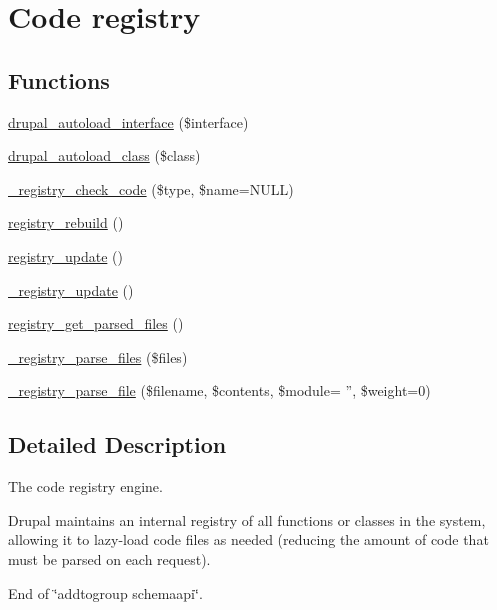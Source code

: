 \hypertarget{group__registry}{
\section{Code registry}
\label{group__registry}
}
\subsection*{Functions}
\begin{DoxyCompactItemize}
\item 
\hyperlink{group__registry_gaf7822bbec92566b95a44dc1c224389e8}{drupal\_\-autoload\_\-interface} (\$interface)
\item 
\hyperlink{group__registry_ga0fee2e4ebba5986067aa486c3436f51e}{drupal\_\-autoload\_\-class} (\$class)
\item 
\hyperlink{group__registry_gac399c501a8a90c383ea9a901a3a45ed6}{\_\-registry\_\-check\_\-code} (\$type, \$name=NULL)
\item 
\hyperlink{group__registry_ga63939dbdcf7950c97292f7d341f6d339}{registry\_\-rebuild} ()
\item 
\hyperlink{group__registry_gaab1bcea9fb061684c700676aa5ebe608}{registry\_\-update} ()
\item 
\hyperlink{group__registry_ga5008c77b133d55af7f1f4442d9e51167}{\_\-registry\_\-update} ()
\item 
\hyperlink{group__registry_ga072b32f340e117845791d7c6770da0f1}{registry\_\-get\_\-parsed\_\-files} ()
\item 
\hyperlink{group__registry_ga3b95761af0c42b685a2f1c4bc39b12d4}{\_\-registry\_\-parse\_\-files} (\$files)
\item 
\hyperlink{group__registry_ga9836752d4694599ffe4c393ff037fd44}{\_\-registry\_\-parse\_\-file} (\$filename, \$contents, \$module= '', \$weight=0)
\end{DoxyCompactItemize}


\subsection{Detailed Description}
The code registry engine.

Drupal maintains an internal registry of all functions or classes in the system, allowing it to lazy-\/load code files as needed (reducing the amount of code that must be parsed on each request).

End of \char`\"{}addtogroup schemaapi\char`\"{}. 

